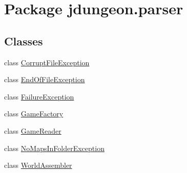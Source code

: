 \hypertarget{namespacejdungeon_1_1parser}{
\section{Package jdungeon.parser}
\label{namespacejdungeon_1_1parser}
}
\subsection*{Classes}
\begin{DoxyCompactItemize}
\item 
class \hyperlink{classjdungeon_1_1parser_1_1_corrupt_file_exception}{CorruptFileException}
\item 
class \hyperlink{classjdungeon_1_1parser_1_1_end_of_file_exception}{EndOfFileException}
\item 
class \hyperlink{classjdungeon_1_1parser_1_1_failure_exception}{FailureException}
\item 
class \hyperlink{classjdungeon_1_1parser_1_1_game_factory}{GameFactory}
\item 
class \hyperlink{classjdungeon_1_1parser_1_1_game_reader}{GameReader}
\item 
class \hyperlink{classjdungeon_1_1parser_1_1_no_maps_in_folder_exception}{NoMapsInFolderException}
\item 
class \hyperlink{classjdungeon_1_1parser_1_1_world_assembler}{WorldAssembler}
\end{DoxyCompactItemize}
